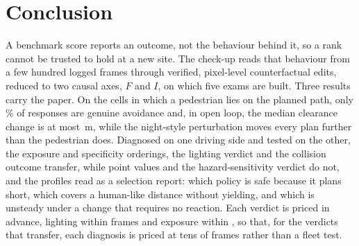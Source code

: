 \section{Conclusion}
A benchmark score reports an outcome, not the behaviour behind it, so a rank cannot be trusted to hold
at a new site. The check-up reads that behaviour from a few hundred logged frames through verified,
pixel-level counterfactual edits, reduced to two causal axes, $F$ and $I$, on which five exams are
built. Three results carry the paper. On the cells in which a pedestrian lies on the planned path, only \NumCfRealPct\% of responses are genuine avoidance and, in open loop, the median clearance change is at most \NumCfDsHi\,m, while the night-style perturbation moves every plan further than the pedestrian does. Diagnosed on one
driving side and tested on the other, the exposure and specificity orderings, the lighting verdict and the collision outcome transfer, while point values and the hazard-sensitivity verdict do not, and the profiles read as a selection report: which policy is safe because it plans short, which covers a human-like distance without yielding, and which is unsteady under a change that requires no reaction. Each verdict is priced in advance, lighting within
\NumNstarCFRhi{} frames and exposure within \NumNstarExpHi, so that, for the verdicts that transfer, each diagnosis is priced at tens of frames rather than a fleet test.
